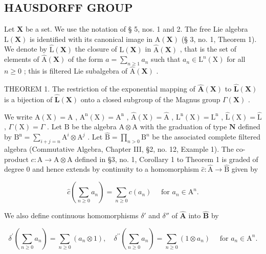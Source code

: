 \subsection{HAUSDORFF GROUP}

Let \(\mathbf{X}\) be a set. We use the notation of § 5, nos. 1 and 2. The free Lie algebra \(\mathrm{L}(\mathbf{X})\) is identified with its canonical image in \(\mathrm{A}(\mathbf{X})\) (§ 3, no. 1, Theorem 1). We denote by \(\hat{\mathrm{L}}(\mathbf{X})\) the closure of \(\mathrm{L}(\mathbf{X})\) in \(\hat{\mathrm{A}}(\mathbf{X})\) , that is the set of elements of \(\hat{\mathrm{A}}(\mathbf{X})\) of the form \(a = \sum_{n\geqslant 1}a_n\) such that \(a_{n}\in \mathrm{L}^{n}(\mathrm{X})\) for all \(n\geqslant 0\) ; this is filtered Lie subalgebra of \(\hat{\mathrm{A}}(\mathbf{X})\) .

THEOREM 1. The restriction of the exponential mapping of \(\hat{\mathbf{A}}(\mathbf{X})\) to \(\hat{\mathbf{L}}(\mathbf{X})\) is a bijection of \(\hat{\mathbf{L}}(\mathbf{X})\) onto a closed subgroup of the Magnus group \(\Gamma(\mathbf{X})\) .

We write \(\mathrm{A}(\mathrm{X}) = \mathrm{A}\) , \(\mathrm{A}^{\mathrm{n}}(\mathrm{X}) = \mathrm{A}^{\mathrm{n}}\) , \(\hat{\mathrm{A}}(\mathrm{X}) = \hat{\mathrm{A}}\) , \(\mathrm{L}^{\mathrm{n}}(\mathrm{X}) = \mathrm{L}^{\mathrm{n}}\) , \(\hat{\mathrm{L}}(\mathrm{X}) = \hat{\mathrm{L}}\) , \(\Gamma(\mathrm{X}) = \Gamma\) . Let \(\mathrm{B}\) be the algebra \(\mathrm{A} \otimes \mathrm{A}\) with the graduation of type \(\mathbf{N}\) defined by \(\mathrm{B}^{\mathrm{n}} = \sum_{i+j=n} \mathrm{A}^{i} \otimes \mathrm{A}^{j}\) . Let \(\hat{\mathrm{B}} = \prod_{n > 0} \mathrm{B}^{n}\) be the associated complete filtered algebra (Commutative Algebra, Chapter III, §2, no. 12, Example 1). The co-product \(c: \mathrm{A} \to \mathrm{A} \otimes \mathrm{A}\) defined in §3, no. 1, Corollary 1 to Theorem 1 is graded of degree 0 and hence extends by continuity to a homomorphism \(\hat c: \hat{\mathrm{A}} \to \hat{\mathrm{B}}\) given by

\[
\hat {c} \left(\sum_ {n \geqslant 0} a _ {n}\right) = \sum_ {n \geqslant 0} c (a _ {n}) \quad \text { for } a _ {n} \in \mathrm{A} ^ {n}.
\]

We also define continuous homomorphisms \(\delta'\) and \(\delta''\) of \(\hat{\mathbf{A}}\) into \(\hat{\mathbf{B}}\) by

\[
\delta^ {\prime} \left(\sum_ {n \geqslant 0} a _ {n}\right) = \sum_ {n \geqslant 0} (a _ {n} \otimes 1), \quad \delta^ {\prime \prime} \left(\sum_ {n \geqslant 0} a _ {n}\right) = \sum_ {n \geqslant 0} (1 \otimes a _ {n}) \quad \text { for } a _ {n} \in \mathrm{A} ^ {n}.
\]

